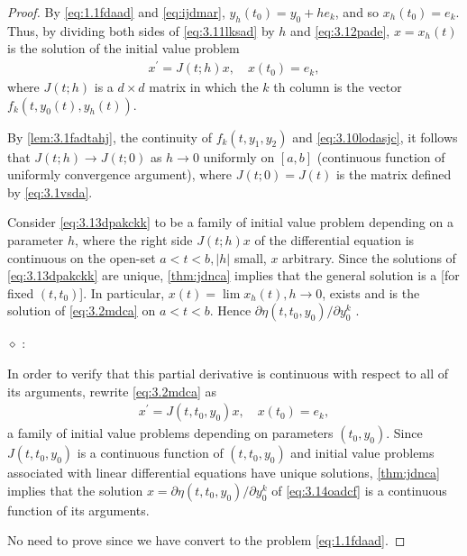 \documentclass{article}
\begin{document}
\begin{proof}
By \cref{eq:1.1fdaad} and \cref{eq:ijdmar}, $y_{h}\left(t_{0}\right)=y_{0}+h e_{k}$, and so $x_{h}\left(t_{0}\right)=e_{k}$. Thus, by dividing both sides of \cref{eq:3.11lksad} by $h$ and \cref{eq:3.12pade}, $x=x_{h}(t)$ is the solution of the initial value problem
\begin{align}
x^{\prime}=J(t ; h) x, \quad x\left(t_{0}\right)=e_{k},\label{eq:3.13dpakckk}
\end{align}
where $J(t ; h)$ is a $d \times d$ matrix in which the $k$ th column is the vector $f_{k}\left(t, y_{0}(t), y_{h}(t)\right) .$ 

By \cref{lem:3.1fadtahj}, the continuity of $f_{k}\left(t, y_{1}, y_{2}\right)$ and \cref{eq:3.10lodasjc}, it follows that $J(t ; h) \rightarrow J(t; 0)$ as $h \rightarrow 0$ uniformly on $[a, b]$ (continuous function of uniformly convergence argument), where $J(t ; 0)= J(t)$ is the matrix defined by \cref{eq:3.1vsda}.

Consider \cref{eq:3.13dpakckk} to be a family of initial value problem depending on a parameter $h$, where the right side $J(t ; h) x$ of the differential equation is continuous on the open-set $a<t<b,|h|$ small, $x$ arbitrary. Since the solutions of \cref{eq:3.13dpakckk} are unique, \cref{thm:jdnca} implies that the general solution is a  [for fixed $\left(t, t_{0}\right)$]. In particular, $x(t)=\lim x_{h}(t), h \rightarrow 0$, exists and is the solution of \cref{eq:3.2mdca} on $a<t<b$. Hence $\partial \eta\left(t, t_{0}, y_{0}\right) / \partial y_{0}^{k}$ .

$\diamond$ :

In order to verify that this partial derivative is continuous with respect to all of its arguments, rewrite \cref{eq:3.2mdca} as
\begin{align}
x^{\prime}=J\left(t, t_{0}, y_{0}\right) x, \quad x\left(t_{0}\right)=e_{k},\label{eq:3.14oadcf}
\end{align}
a family of initial value problems depending on parameters $\left(t_{0}, y_{0}\right)$. Since $J\left(t, t_{0}, y_{0}\right)$ is a continuous function of $\left(t, t_{0}, y_{0}\right)$ and initial value problems associated with linear differential equations have unique solutions, \cref{thm:jdnca} implies that the solution $x=\partial \eta\left(t, t_{0}, y_{0}\right) / \partial y_{0}^{k}$ of \cref{eq:3.14oadcf} is a continuous function of its arguments.

 No need to prove since we have convert to the problem \cref{eq:1.1fdaad}.


\end{proof}
\end{document}
